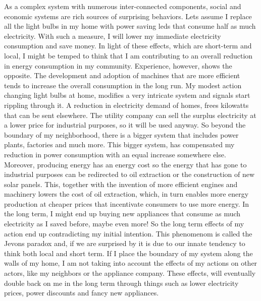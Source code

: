 \documentclass[12pt]{article}
\begin{document}
As a complex system with numerous inter-connected components, social and economic systems are  rich sources of surprising behaviors. Lets assume I replace all the light bulbs in my home with power saving leds that consume half as much electricity. With such a measure, I will  lower my immediate electricity consumption and save money. In light of these effects, which are short-term and local, I might be temped to think that I am contributing to an overall reduction in energy consumption in my community. Experience, however, shows the opposite. The development and adoption of machines that are more efficient tends to increase the overall consumption in the long run. My modest action changing light bulbs at home, modifies a very intricate system and signals start rippling through it. A reduction in electricity demand of homes, frees kilowatts that can be sent elsewhere. The utility company can sell the surplus electricity at a lower price for industrial purposes, so it will be used anyway. So beyond the boundary of my neighborhood, there is a bigger system that includes power plants, factories and much more. This bigger system, has compensated my reduction in power consumption with an equal increase somewhere else. Moreover, producing energy has an energy cost so the energy that has gone to industrial purposes can be redirected to oil extraction or the construction of new solar panels. This, together with the invention of more efficient engines and machinery lowers the cost of oil extraction, which, in turn enables more energy production at cheaper prices that incentivate consumers to use more energy. In the long term, I might end up  buying new appliances that consume as much electricity as I saved before, maybe even more! So the long term effects of my action end up contradicting my initial intention. This phenomenom is called the Jevons paradox and, if we are surprised by it is due to our innate tendency to think both local and short term. If I place the boundary of my system along the walls of my home, I am not taking into account the effects of my actions on other actors, like my neighbors or the appliance company. These effects, will eventually double back on me in the long term through things such as lower electricity prices, power discounts and fancy new appliances.
\end{document}
